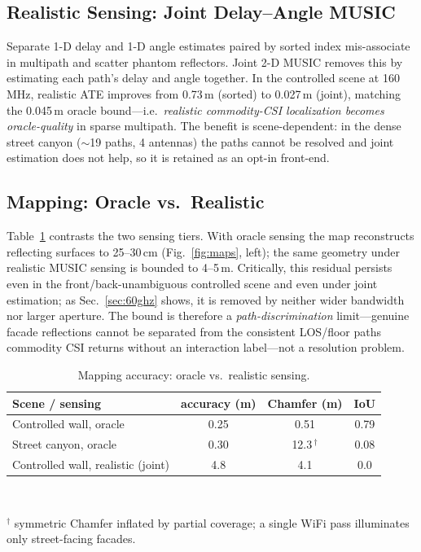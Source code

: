 \documentclass[journal]{IEEEtran}
\newcommand{\SI}[2]{#1\,#2}
\newcommand{\SIrange}[3]{#1--#2\,#3}
\begin{document}
\subsection{Realistic Sensing: Joint Delay--Angle MUSIC}
Separate 1-D delay and 1-D angle estimates paired by sorted index mis-associate in
multipath and scatter phantom reflectors. Joint 2-D MUSIC removes this by estimating
each path's delay and angle together. In the controlled scene at \SI{160}{MHz},
realistic ATE improves from \SI{0.73}{m} (sorted) to \SI{0.027}{m} (joint),
matching the \SI{0.045}{m} oracle bound---i.e.\ \emph{realistic commodity-CSI
localization becomes oracle-quality} in sparse multipath. The benefit is
scene-dependent: in the dense street canyon (\(\sim\)19 paths, 4 antennas) the paths
cannot be resolved and joint estimation does not help, so it is retained as an
opt-in front-end.

\subsection{Mapping: Oracle vs.\ Realistic}
Table~\ref{tab:map} contrasts the two sensing tiers. With oracle sensing the map
reconstructs reflecting surfaces to \SIrange{25}{30}{cm}
(Fig.~\ref{fig:maps}, left); the same geometry under realistic MUSIC sensing is
bounded to \SIrange{4}{5}{m}. Critically, this residual persists even in the
front/back-unambiguous controlled scene and even under joint estimation; as
Sec.~\ref{sec:60ghz} shows, it is removed by neither wider bandwidth nor larger
aperture. The bound is therefore a \emph{path-discrimination} limit---genuine
facade reflections cannot be separated from the consistent LOS/floor paths
commodity CSI returns without an interaction label---not a resolution problem.

\begin{table}[t]
\caption{Mapping accuracy: oracle vs.\ realistic sensing.}
\label{tab:map}
\centering
\small
\begin{tabular}{@{}lccc@{}}
\toprule
Scene / sensing & accuracy (m) & Chamfer (m) & IoU\\
\midrule
Controlled wall, oracle & 0.25 & 0.51 & 0.79\\
Street canyon, oracle & 0.30 & 12.3\,$^\dagger$ & 0.08\\
Controlled wall, realistic (joint) & 4.8 & 4.1 & 0.0\\
\bottomrule
\end{tabular}
\\[2pt]
\raggedright\footnotesize $^\dagger$ symmetric Chamfer inflated by partial
coverage; a single WiFi pass illuminates only street-facing facades.
\end{table}
\end{document}
